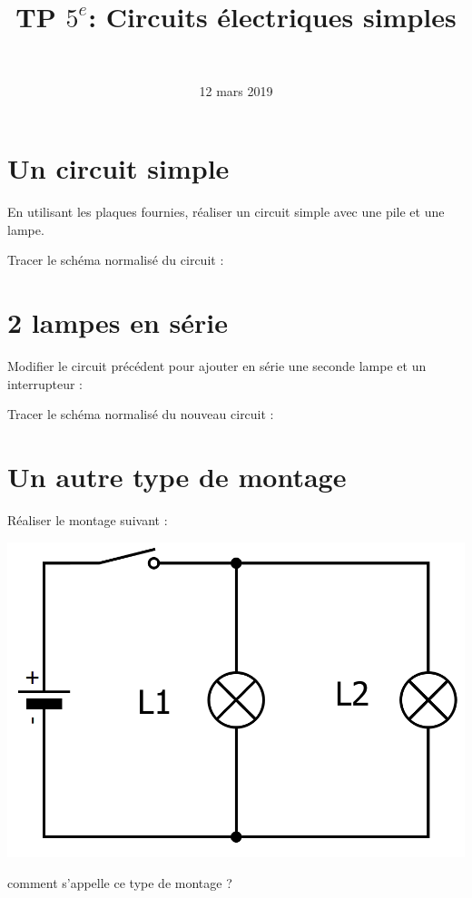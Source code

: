 \documentclass[a4paper,11pt]{exam}
\author{\ }
\date{12 mars 2019}
\title{TP $5^e$: Circuits électriques simples}
\begin{document}
	\maketitle

\section{Un circuit simple}\label{part:liquide}


En utilisant les plaques fournies, réaliser un circuit simple avec une pile et une lampe.

\begin{questions}
	\question Tracer le schéma normalisé du circuit :
	
	
	\makeemptybox{8cm}
	
\end{questions}


\section{2 lampes en série}

Modifier le circuit précédent pour ajouter en série une seconde lampe et un interrupteur :

\begin{questions}
	\question Tracer le schéma normalisé du nouveau circuit :
	
	
	\makeemptybox{8cm}
	
\end{questions}


\section{Un autre type de montage}

Réaliser le montage suivant :

\begin{center}
	\includegraphics[scale=0.35]{../img/drv}
\end{center}
\begin{questions}
	\question comment s'appelle ce type de montage ?
	
	\fillwithdottedlines{2cm}
\end{questions}

\ \label{LastPage}
\end{document}
